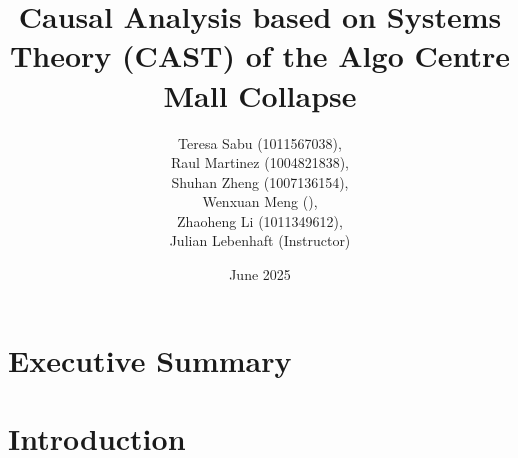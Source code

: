 \documentclass[12pt]{article}
\title{}
\date{June 2025}
\begin{document}
\title{Causal Analysis based on Systems Theory (CAST) of the Algo Centre Mall Collapse}
\author{Teresa Sabu (1011567038), \\
Raul Martinez (1004821838), \\
Shuhan Zheng (1007136154), \\
Wenxuan Meng (), \\
Zhaoheng Li (1011349612), \\
Julian Lebenhaft (Instructor)
}
\maketitle

\newpage



\tableofcontents
\newpage

\section*{Executive Summary}


\section*{Introduction} 
\end{document}
